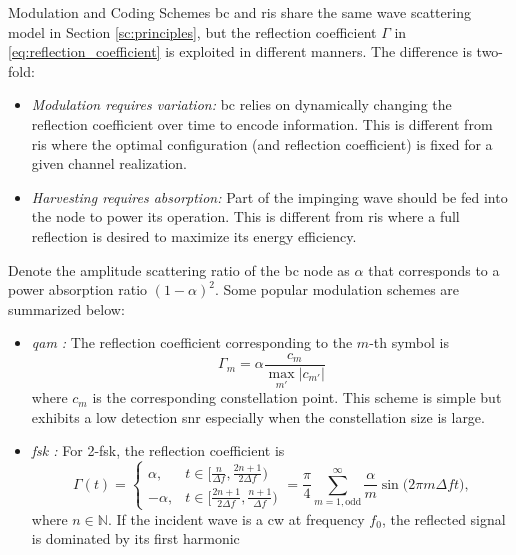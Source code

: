 \begin{section}{}
	\begin{subsection}{Modulation and Coding Schemes}
		\label{sc:mcs}
		\gls{bc} and \gls{ris} share the same wave scattering model in Section \ref{sc:principles}, but the reflection coefficient $\Gamma$ in \eqref{eq:reflection_coefficient} is exploited in different manners.
		The difference is two-fold:
		\begin{itemize}
			\item \emph{Modulation requires variation:} \gls{bc} relies on dynamically changing the reflection coefficient over time to encode information. This is different from \gls{ris} where the optimal configuration (and reflection coefficient) is fixed for a given channel realization.
			\item \emph{Harvesting requires absorption:} Part of the impinging wave should be fed into the node to power its operation. This is different from \gls{ris} where a full reflection is desired to maximize its energy efficiency.
		\end{itemize}
		Denote the amplitude scattering ratio of the \gls{bc} node as $\alpha$ that corresponds to a power absorption ratio $(1-\alpha)^2$. Some popular modulation schemes are summarized below:
		\begin{itemize}
			\item \emph{\gls{qam} \cite{Thomas2012a}:} The reflection coefficient corresponding to the $m$-th symbol is
			\begin{equation}
				\Gamma_m = \alpha \frac{c_m}{\max_{m'} \lvert c_{m'} \rvert}
			\end{equation}
			where $c_m$ is the corresponding constellation point.
			This scheme is simple but exhibits a low detection \gls{snr} especially when the constellation size is large.
			\item \emph{\gls{fsk} \cite{Abbasi2021a}:} For 2-\gls{fsk}, the reflection coefficient is
			\begin{equation}
				\Gamma(t) =
				\begin{cases}
					\alpha, & t \in \bigl[\frac{n}{\Delta f},\frac{2n+1}{2 \Delta f}\bigr) \\
					-\alpha, & t \in \bigl[\frac{2n+1}{2 \Delta f},\frac{n+1}{\Delta f}\bigr)
				\end{cases}
				= \frac{\pi}{4} \sum_{m=1,\text{odd}}^\infty \frac{\alpha}{m} \sin\bigl(2\pi m \Delta f t\bigr),
			\end{equation}
			where $n \in \mathbb{N}$.
			If the incident wave is a \gls{cw} at frequency $f_0$, the reflected signal is dominated by its first harmonic

\end{itemize}
\end{subsection}
\end{section}
